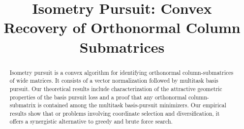 \documentclass{article}
\title{Isometry Pursuit: Convex Recovery of Orthonormal Column Submatrices}
\begin{document}
\maketitle 

\begin{abstract}
Isometry pursuit is a convex algorithm for identifying orthonormal column-submatrices of wide matrices.
It consists of a vector normalization followed by multitask basis pursuit.
Our theoretical results include characterization of the attractive geometric properties of the basis pursuit loss and a proof that any orthonormal column-submatrix is contained among the multitask basis-pursuit minimizers.
Our empirical results show that or problems involving coordinate selection and diversification, it offers a synergistic alternative to greedy and brute force search.
\end{abstract}








\newpage



\newpage

%

\newpage


\end{document}
